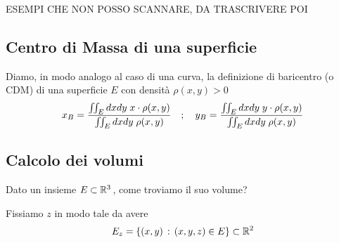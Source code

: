 \newpage

ESEMPI CHE NON POSSO SCANNARE, DA TRASCRIVERE POI 

\newpage

\subsection{Centro di Massa di una superficie}

Diamo, in modo analogo al caso di una curva, la definizione di baricentro (o CDM) di una superficie $E$ con densità $\rho(x,y)>0$
\begin{align}
	x_B = \frac{\iint_E dxdy \; x\cdot \rho(x,y)}{\iint_E dxdy \;  \rho(x,y)} \quad ; \quad y_B = \frac{\iint_E dxdy \; y\cdot \rho(x,y)}{\iint_E dxdy \;  \rho(x,y)}
\end{align}

\begin{figure}[!htb]
\end{figure}

\newpage

\subsection{Calcolo dei volumi}
Dato un insieme $E\subset \mathbb{R}^3$, come troviamo il suo volume?

Fissiamo $z$ in modo tale da avere
\begin{align}
	E_z= \{(x,y) \, : \, (x,y,z) \in E\}\subset \mathbb{R}^2
\end{align}

